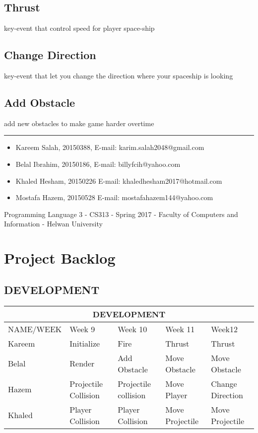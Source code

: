 \documentclass[]{article}
\begin{document}
\subsection{Thrust}
key-event that control speed for player space-ship

\subsection{Change Direction}
key-event that let you change the direction where your spaceship is looking

\subsection{Add Obstacle}
add new obstacles to make game harder overtime 

\noindent\rule{12cm}{0.5pt}

\begin{itemize}

  \item Kareem Salah, 20150388,
  \newline
  E-mail: karim.salah2048@gmail.com
  
  \item Belal Ibrahim, 20150186,
  \newline
  E-mail: billyfcih@yahoo.com
  
  \item Khaled Hesham, 20150226
  \newline
  E-mail: khaledhesham2017@hotmail.com
  
  \item Mostafa Hazem, 20150528
  \newline
  E-mail: mostafahazem144@yahoo.com
  
\end{itemize}
Programming Language 3 - CS313 - Spring 2017 - Faculty of
Computers and Information - Helwan University

\section{Project Backlog}

\subsection{DEVELOPMENT}

\begin{tabular}{|p{2.5cm}|p{3cm}|p{3cm}|p{3cm}|p{3cm}|}
 \hline
 \multicolumn{5}{|c|}{DEVELOPMENT} \\
 \hline
 NAME/WEEK & Week 9 & Week 10 & Week 11 & Week12\\
 \hline
 Kareem & Initialize & Fire & Thrust & Thrust \\
 \hline
 Belal& Render & Add Obstacle & Move Obstacle & Move Obstacle \\
 \hline
 Hazem & Projectile Collision & Projectile collision & Move Player & Change Direction\\
 \hline
 Khaled & Player Collision & Player Collision &  Move Projectile &Move Projectile\\
 \hline
\end{tabular}
\end{document}
